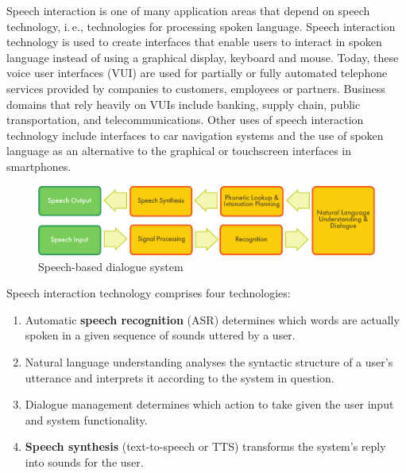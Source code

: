 \begin{multicols}{2}
Speech interaction is one of many application areas that depend on speech technology, i.\,e., technologies for processing spoken language. Speech interaction technology is used to create interfaces that enable users to interact in spoken language instead of using a graphical display, keyboard and mouse.  Today, these voice user interfaces (VUI) are used for partially or fully automated telephone services provided by companies to customers, employees or partners. Business domains that rely heavily on VUIs include banking, supply chain, public transportation, and telecommunications. Other uses of speech interaction technology include interfaces to car navigation systems and the use of spoken language as an alternative to the graphical or touchscreen interfaces in smartphones.


\begin{figure}[htb]
  \center
  \includegraphics[width=\textwidth]{../_media/english/simple_speech-based_dialogue_architecture}
  \caption{Speech-based dialogue system}
\label{fig:dialoguearch_en}
\end{figure}

Speech interaction technology comprises four technologies: 

\begin{enumerate}
\item Automatic \textbf{speech recognition} (ASR) determines which words are actually spoken in a given sequence of sounds uttered by a user.  
\item Natural language understanding analyses the syntactic structure of a user’s utterance and interprets it according to the system in question.
\item Dialogue management determines which action to take given the user input and system functionality.   
\item \textbf{Speech synthesis} (text-to-speech or TTS) transforms the system’s reply into sounds for the user.
\end{enumerate}


\end{multicols}
